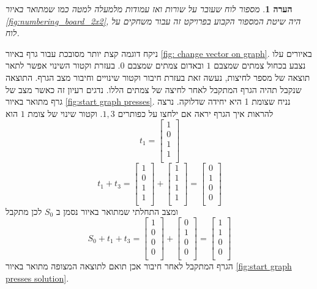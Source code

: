 \documentclass[12pt,leqno]{article}
\theoremstyle{theoremdd}
\newtheorem{comm}{הערה}[section]
\begin{document}
\begin{comm}
    \label{ comm: indexing board game}
    מספור לוח שעובר על שורות ואז עמודות מלמעלה למטה כמו שמתואר באיור
    \ref{fig:numbering_board_2x2},
     היה שיטת המספור הקבוע בפרויקט זה עבור משחקים על לוח.
\end{comm}
ניקח דוגמה קצת יותר מסובכת
עבור גרף באיור
\ref{fig: change vector on graph}.
באיורים עלו נצבע בכחול צמתים שמצבם  
$1$
ובאדום 
צמתים שמצבם 
$0$.
בעזרת וקטור השינוי אפשר לתאר תוצאה של מספר לחיצות,
נעשה זאת בעזרת חיבור וקטור שינויים
וחיבור מצב הגרף.
התוצאה שנקבל 
תהיה הגרף המתקבל לאחר לחיצה של צמתים
הללו.
נדגים רעיון זה כאשר מצב של גרף מתואר באיור
\ref{fig:start graph presses}.
נניח שצומת 1 היא יחידה שדלוקה.
נרצה להראות איך הגרף יראה אם ילחצו על כפותרים 
$1, 3$.
וקטור שינוי של צומת 
$1$
הוא
\[
    t_1 = 
    \begin{bmatrix}
        1 \\
        0 \\
        1 \\
        1 \\
    \end{bmatrix}
\]
\[
    t_1 + t_3 = 
    \begin{bmatrix}
        1 \\
        0 \\
        1 \\
        1 \\
    \end{bmatrix}
    +
    \begin{bmatrix}
        1 \\
        1 \\
        1 \\
        1 \\
    \end{bmatrix}
    =
    \begin{bmatrix}
        0 \\
        1 \\
        0 \\
        0 \\
    \end{bmatrix}
\]
ומצב התחלתי שמתואר באיור נסמן ב
$S_0$
לכן מתקבל
\[
    S_0 + t_1 + t_3 = 
    \begin{bmatrix}
        1 \\
        0 \\
        0 \\
        0 \\
    \end{bmatrix}
    +
    \begin{bmatrix}
        0 \\
        1 \\
        0 \\
        0 \\
    \end{bmatrix}
    =
    \begin{bmatrix}
        1 \\
        1 \\
        0 \\
        0 \\
    \end{bmatrix}
\]
הגרף המתקבל לאחר חיבור אכן תואם לתוצאה המצופה
מתואר באיור 
\ref{fig:start graph presses solution}.
\end{document}
